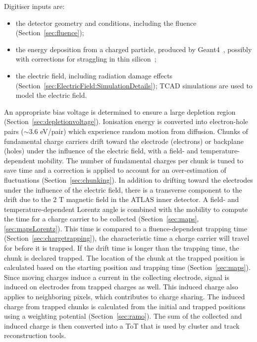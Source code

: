 Digitiser inputs are:
\begin{itemize}

\item the detector geometry and conditions, including the fluence (Section~\ref{sec:fluence});
\item the  energy deposition from a charged particle, produced by Geant4~\cite{Agostinelli:2002hh}, possibly with corrections for straggling in thin silicon~\cite{Bichsel:1988if};
\item the electric field, including radiation damage effects (Section~\ref{sec:ElectricField:SimulationDetails}); TCAD simulations are used to model the electric field.
 \end{itemize}
 
 An appropriate bias voltage is determined to ensure a large depletion region (Section~\ref{sec:depletionvoltage}).  Ionisation energy is converted into electron-hole pairs ($\sim 3.6$ eV/pair) which experience random motion from diffusion.  Chunks of fundamental charge carriers drift toward the electrode (electrons) or backplane (holes) under the influence of the electric field, with a field- and temperature-dependent mobility.  The number of fundamental charges per chunk is tuned to save time and a correction is applied to account for an over-estimation of fluctuations (Section~\ref{sec:chunking}).  In addition to drifting toward the electrodes under the influence of the electric field, there is a transverse component to the drift due to the 2 T magnetic field in the ATLAS inner detector.  A field- and temperature-dependent Lorentz angle is combined with the mobility to compute the time for a charge carrier to be collected (Section~\ref{sec:maps},\ref{sec:mapsLorentz}).  This time is compared to a fluence-dependent trapping time (Section~\ref{sec:chargetrapping}), the characteristic time a charge carrier will travel for before it is trapped.  If the drift time is longer than the trapping time, the chunk is declared trapped.  The location of the chunk at the trapped position is calculated based on the starting position and trapping time (Section~\ref{sec:maps}).  Since moving charges induce a current in the collecting electrode, signal is induced on electrodes from trapped charges as well.  This induced charge also applies to neighboring pixels, which contributes to charge sharing.  The induced charge from trapped chunks is calculated from the initial and trapped positions using a weighting potential (Section~\ref{sec:ramo}).  The sum of the collected and induced charge is then converted into a ToT that is used by cluster and track reconstruction tools.



